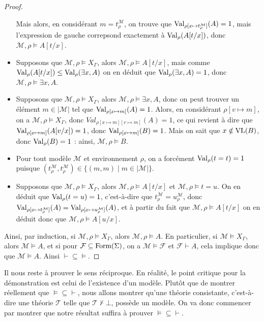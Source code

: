 \begin{proof}
\begin{itemize}
    Mais alors, en considérant $m = t^\mathcal M_\rho$, on trouve que
    $\operatorname{Val}_{\rho[x\mapsto t^\mathcal M_\rho]}(A) = 1$, mais l'expression de gauche
    correpsond exactement à $\operatorname{Val}_\rho(A[t/x])$, donc
    $\mathcal M,\rho\models A[t/x]$.
  \item Supposons que $\mathcal M,\rho\models X_\Gamma$, alors
    $\mathcal M,\rho\models A[t/x]$, mais comme
    $\operatorname{Val}_\rho(A[t/x])\leq\operatorname{Val}_\rho(\exists x,A)$ on en déduit que
    $\operatorname{Val}_\rho(\exists x,A) = 1$, donc $\mathcal M,\rho\models \exists x,A$.
  \item Supposons que $\mathcal M,\rho\models X_\Gamma$, alors
    $\mathcal M,\rho\models \exists x,A$, donc on peut trouver un élément
    $m\in|\mathcal M|$ tel que $\operatorname{Val}_{\rho[x\mapsto m]}(A) = 1$. Alors, en
    considérant $\rho[v\mapsto m]$, on a $\mathcal M,\rho \models X_\Gamma$, donc
    $Val_{\rho[x\mapsto m][v\mapsto m]}(A) = 1$, ce qui revient à dire que
    $\operatorname{Val}_{\rho[x\mapsto m]}(A[v/x]) = 1$, donc $\operatorname{Val}_{\rho[x\mapsto m]}(B) = 1$. Mais
    on sait que $x\notin\operatorname{VL}(B)$, donc $\operatorname{Val}_\rho(B) = 1$ : ainsi,
    $\mathcal M,\rho\models B$.
  \item Pour tout modèle $\mathcal M$ et environnement $\rho$, on a forcément
    $\operatorname{Val}_\rho(t=t) = 1$ puisque
    $(t^\mathcal M_\rho,t^\mathcal M_\rho)\in\{(m,m)\mid m\in|\mathcal M|\}$.
  \item Supposons que $\mathcal M,\rho\models X_\Gamma$, alors
    $\mathcal M,\rho\models A[t/x]$ et $\mathcal M,\rho\models t = u$. On en
    déduit que $\operatorname{Val}_\rho(t = u) = 1$, c'est-à-dire que
    $t^\mathcal M_\rho = u^\mathcal M_\rho$, donc
    $\operatorname{Val}_{\rho[x\mapsto t^\mathcal M_\rho]}(A) = \operatorname{Val}_{\rho[x\mapsto u^\mathcal M_\rho]}(A)$,
    et à partir du fait que $\mathcal M,\rho\models A[t/x]$ on en déduit donc
    que $\mathcal M,\rho\models A[u/x]$.
  \end{itemize}

  Ainsi, par induction, si $\mathcal M,\rho\models X_\Gamma$, alors
  $\mathcal M,\rho\models A$. En particulier, si $\mathcal M\models X_\Gamma$,
  alors $\mathcal M\models A$, et si pour
  $\mathcal F\subseteq \operatorname{Form}(\Sigma)$, on a
  $\mathcal M\models \mathcal F$ et $\mathcal F\vdash A$, cela implique donc que
  $\mathcal M\models A$. Ainsi $\vdash\subseteq\vDash$.
\end{proof}

Il nous reste à prouver le sens réciproque. En réalité, le point critique pour
la démonstration est celui de l'existence d'un modèle. Plutôt que de montrer
réellement que $\vDash\subseteq\vdash$, nous allons montrer qu'une théorie
consistante, c'est-à-dire une théorie $\mathcal T$ telle que
$\mathcal T\not\vdash \bot$, possède un modèle. On va donc commencer par montrer
que notre résultat suffira à prouver $\vDash\subseteq\vdash$.

